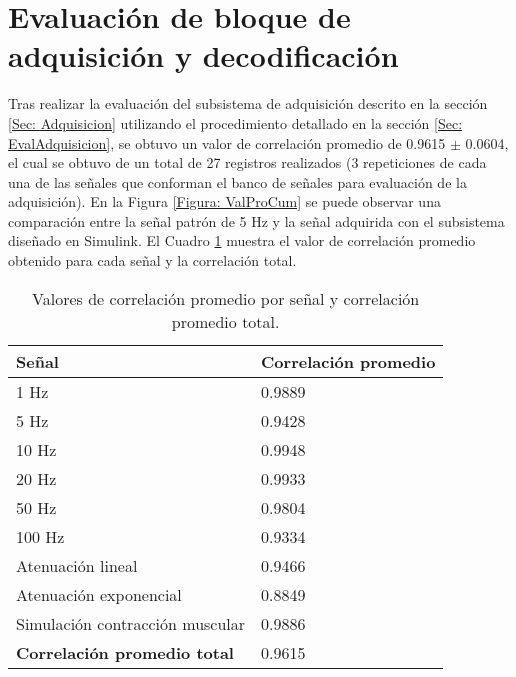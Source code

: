 
\section{Evaluación de bloque de adquisición y decodificación}
Tras realizar la evaluación del subsistema de adquisición descrito en la sección \ref{Sec: Adquisicion} utilizando el procedimiento detallado en la sección \ref{Sec: EvalAdquisicion}, se obtuvo un valor de correlación promedio de 0.9615 $\pm$ 0.0604, el cual se obtuvo de un total de 27 registros realizados (3 repeticiones de cada una de las señales que conforman el banco de señales para evaluación de la adquisición). En la Figura \ref{Figura: ValProCum} se puede observar una comparación entre la señal patrón de 5 Hz y la señal adquirida con el subsistema diseñado en Simulink\textregistered. El Cuadro \ref{Cuadro:ValoresCorre} muestra el valor de correlación promedio obtenido para cada señal y la correlación total.

\begin{table}[htbp]
	\centering
	\begin{tabular}{|p{6cm}|l|}
	\hline
	\textbf{Señal} & \textbf{Correlación promedio}\\ \hline	\hline
	1 Hz & 0.9889\\ \hline
	5 Hz & 0.9428\\ \hline
	10 Hz & 0.9948\\ \hline
	20 Hz & 0.9933\\ \hline
	50 Hz & 0.9804\\ \hline
	100 Hz & 0.9334\\ \hline
	Atenuación lineal & 0.9466\\ \hline
	Atenuación exponencial & 0.8849\\ \hline
	Simulación contracción muscular & 0.9886\\ \hline
	\textbf{Correlación promedio total} & 0.9615\\ \hline
	\end{tabular}
	\caption{Valores de correlación promedio por señal y correlación promedio total.}
	\label{Cuadro:ValoresCorre}
\end{table}


